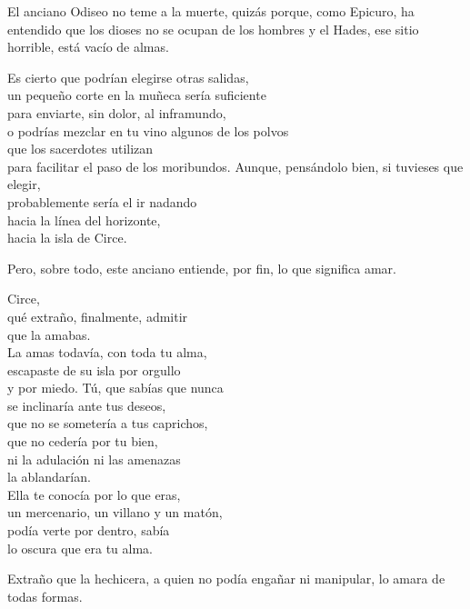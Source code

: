 El anciano Odiseo no teme a la muerte, quizás porque, como Epicuro, ha entendido que los dioses no se ocupan de los hombres y el Hades, ese sitio horrible, está vacío de almas.

\begin{versopropio}
Es cierto que podrían elegirse otras salidas,\\
un pequeño corte en la muñeca sería suficiente\\
para enviarte, sin dolor, al inframundo,\\
o podrías mezclar en tu vino algunos de los polvos\\
que los sacerdotes utilizan\\
para facilitar el paso de los moribundos.
\stanzabreak
Aunque, pensándolo bien, si tuvieses que elegir,\\
probablemente sería el ir nadando\\
hacia la línea del horizonte,\\
hacia la isla de Circe.
\end{versopropio}

Pero, sobre todo, este anciano entiende, por fin, lo que significa amar.

\begin{versopropio}
Circe,\\
qué extraño, finalmente, admitir\\
que la amabas.\\
La amas todavía, con toda tu alma,\\
escapaste de su isla por orgullo\\
y por miedo.
\stanzabreak
Tú, que sabías que nunca\\
se inclinaría ante tus deseos,\\
que no se sometería a tus caprichos,\\
que no cedería por tu bien,\\
ni la adulación ni las amenazas\\
la ablandarían.\\
Ella te conocía por lo que eras,\\
un mercenario, un villano y un matón,\\
podía verte por dentro, sabía\\
lo oscura que era tu alma.
\end{versopropio}

Extraño que la hechicera, a quien no podía engañar ni manipular, lo amara de todas formas.

